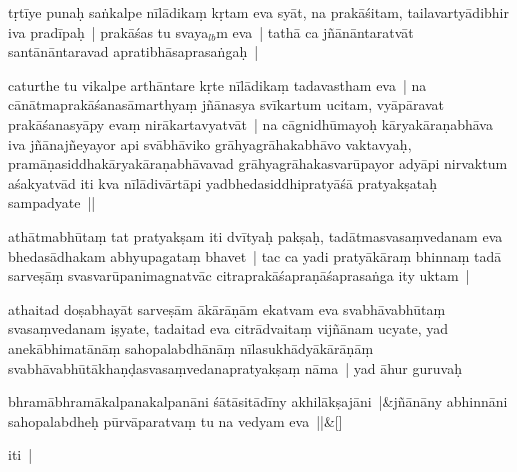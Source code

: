 \documentclass[article,12pt,a4paper]{memoir}%
\newcounter{parCount}
\begin{document}
	  
	  \pstart \leavevmode%
	\label{thakur75-142.15}tṛtīye punaḥ saṅkalpe nīlādikaṃ kṛtam eva syāt, na prakāśitam, tailavartyādibhir iva pradīpaḥ | prakāśas tu svaya{\tiny $_{lb}$}\label{RNAms_76a4}m eva | tathā ca jñānāntaratvāt santānāntaravad apratibhāsaprasaṅgaḥ |
	{}
	\pend%
      

	  
	  \pstart \leavevmode%
	\label{thakur75-142.18}caturthe tu vikalpe arthāntare kṛte nīlādikaṃ tadavastham eva | na cānātmaprakāśanasāmarthyaṃ jñānasya svīkartum ucitam, vyāpāravat prakāśanasyāpy evaṃ nirākartavyatvāt | na cāgnidhūmayoḥ kāryakāraṇabhāva iva jñānajñeyayor api svābhāviko grāhyagrāhakabhāvo vaktavyaḥ, pramāṇasiddhakāryakāraṇabhāvavad grāhyagrāhakasvarūpayor adyāpi nirvaktum aśakyatvād iti kva nīlādivārtāpi yadbhedasiddhipratyāśā pratyakṣataḥ sampadyate ||
	{}
	\pend%
      

	  
	  \pstart \leavevmode%
	\label{thakur75-142.24}athātmabhūtaṃ tat pratyakṣam iti dvītyaḥ pakṣaḥ, tadātmasvasaṃvedanam eva bhedasādhakam abhyupagataṃ bhavet | tac ca yadi pratyākāraṃ bhinnaṃ tadā sarveṣāṃ svasvarūpanimagnatvāc citraprakāśapraṇāśaprasaṅga ity uktam |
	{}
	\pend%
      

	  
	  \pstart \leavevmode%
	\label{thakur75-142.27}athaitad doṣabhayāt sarveṣām ākārāṇām ekatvam eva svabhāvabhūtaṃ svasaṃvedanam iṣyate, tadaitad eva citrādvaitaṃ vijñānam ucyate, yad anekābhimatānāṃ sahopalabdhānāṃ nīlasukhādyākārāṇāṃ svabhāvabhūtākhaṇḍasvasaṃvedanapratyakṣaṃ nāma | yad āhur guruvaḥ
	{}
	\pend%
      
	    
	    \stanza[\smallbreak]
	  bhramābhramākalpanakalpanāni śātāsitādīny akhilākṣajāni |&jñānāny abhinnāni sahopalabdheḥ pūrvāparatvaṃ tu na vedyam eva ||\&[\smallbreak]
	  
	  
	  

	  
	  \pstart \leavevmode%
	iti |
	{}
	\pend%
      
\end{document}
